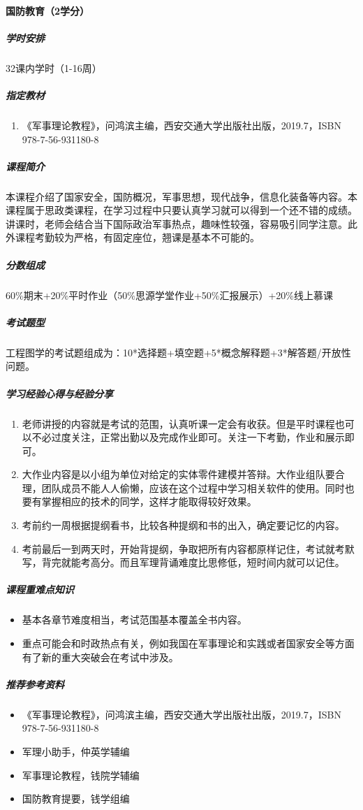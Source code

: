 \documentclass[
decoration,  %
]{qyxf-book}
\begin{document}
\paragraph{国防教育（2学分）}
\subparagraph{学时安排}
32课内学时（1-16周）

\subparagraph{指定教材}
\begin{enumerate}
	\item 《军事理论教程》，问鸿滨主编，西安交通大学出版社出版，2019.7，ISBN 978-7-56-931180-8
\end{enumerate}

\subparagraph{课程简介}
本课程介绍了国家安全，国防概况，军事思想，现代战争，信息化装备等内容。本课程属于思政类课程，在学习过程中只要认真学习就可以得到一个还不错的成绩。讲课时，老师会结合当下国际政治军事热点，趣味性较强，容易吸引同学注意。此外课程考勤较为严格，有固定座位，翘课是基本不可能的。

\subparagraph{分数组成}
60\%期末+20\%平时作业（50\%思源学堂作业+50\%汇报展示）+20\%线上慕课

\subparagraph{考试题型}
工程图学的考试题组成为：10*选择题+填空题+5*概念解释题+3*解答题/开放性问题。

\subparagraph{学习经验心得与经验分享}
\begin{enumerate}
	\item 老师讲授的内容就是考试的范围，认真听课一定会有收获。但是平时课程也可以不必过度关注，正常出勤以及完成作业即可。关注一下考勤，作业和展示即可。
	\item 大作业内容是以小组为单位对给定的实体零件建模并答辩。大作业组队要合理，团队成员不能人人偷懒，应该在这个过程中学习相关软件的使用。同时也要有掌握相应的技术的同学，这样才能取得较好效果。
	\item 考前约一周根据提纲看书，比较各种提纲和书的出入，确定要记忆的内容。
	\item 考前最后一到两天时，开始背提纲，争取把所有内容都原样记住，考试就考默写，背完就能考高分。而且军理背诵难度比思修低，短时间内就可以记住。
\end{enumerate}

\subparagraph{课程重难点知识}
\begin{itemize}
	\item 基本各章节难度相当，考试范围基本覆盖全书内容。
	\item 重点可能会和时政热点有关，例如我国在军事理论和实践或者国家安全等方面有了新的重大突破会在考试中涉及。
\end{itemize}

\subparagraph{推荐参考资料}
\begin{itemize}
	\item 《军事理论教程》，问鸿滨主编，西安交通大学出版社出版，2019.7，ISBN 978-7-56-931180-8
	\item 军理小助手，仲英学辅编
	\item 军事理论教程，钱院学辅编
	\item 国防教育提要，钱学组编
\end{itemize}
\end{document}
